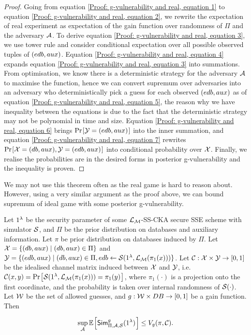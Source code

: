 \begin{proof}
Going from equation \ref{Proof: g-vulnerability and real, equation 1} to equation \ref{Proof: g-vulnerability and real, equation 2}, we rewrite the expectation of real experiment as expectation of the gain function over randomness of $\Pi$ and the adversary $\mathcal{A}$. To derive equation \ref{Proof: g-vulnerability and real, equation 3}, we use tower rule and consider conditional expectation over all possible observed tuples of $(edb, aux)$. Equation \ref{Proof: g-vulnerability and real, equation 4} expands equation \ref{Proof: g-vulnerability and real, equation 3} into summations. From optimisation, we know there is a deterministic strategy for the adversary $\mathcal{A}$ to maximise the function, hence we can convert supremum over adversaries into an adversary who deterministically pick a guess for each observed $(edb, aux)$ as of equation \ref{Proof: g-vulnerability and real, equation 5}, the reason why we have inequality between the equations is due to the fact that the deterministic strategy may not be polynomial in time and size. Equation \ref{Proof: g-vulnerability and real, equation 6} brings $\prob{\Y = (\edb, \aux)}$ into the inner summation, and equation \ref{Proof: g-vulnerability and real, equation 7} rewrites $ \prob{\X = (\db, \aux), \Y = (\edb, \aux)}$ into conditional probability over $\mathcal{X}$. Finally, we realise the probabilities are in the desired forms in posterior g-vulnerability and the inequality is proven.
\end{proof}


We may not use this theorem often as the real game is hard to reason about. However, using a very similar argument as the proof above, we can bound supremum of ideal game with some posterior g-vulnerability.


\begin{theorem}
	\normalfont
	Let $1^{\lambda}$ be the security parameter of some $\mathcal{L}_\mathcal{M}$-SS-CKA secure SSE scheme with simulator $\mathcal{S}$, and $\Pi$ be the prior distribution on databases and auxiliary information. Let $\pi$ be prior distribution on databases induced by $\Pi$. Let $\mathcal{X} = \{ (db, aux) \mid (db, aux) \in \Pi \}$ and $\mathcal{Y} = \{(edb, aux) \mid (db, aux) \in \Pi, edb \gets \mathcal{S}(1^{\lambda}, \mathcal{L}_\mathcal{M}(\pi_1(x))) \}$. Let $\mathcal{C}: \mathcal{X} \times \mathcal{Y} \rightarrow [0,1]$ be the idealised channel matrix induced between $\mathcal{X}$ and $\mathcal{Y}$, i.e. $\channel(x,y) = \prob{\simer(\secparam, \leakm(\pi_1(x))) = \pi_1(y)}$, where $\pi_1(\cdot)$ is a projection onto the first coordinate, and the probability is taken over internal randomness of $\mathcal{S}(\cdot)$. Let $\mathcal{W}$ be the set of allowed guesses, and $g:\mathcal{W} \times DB \rightarrow [0,1]$ be a gain function. Then
	
	\begin{equation*}
	\sup_{\adversary} \expect{\simulator_{\Pi, \adversary, \simer}^{g}(\secparam)} \leq V_{g}(\pi, \channel).
	\end{equation*}
\end{theorem}


